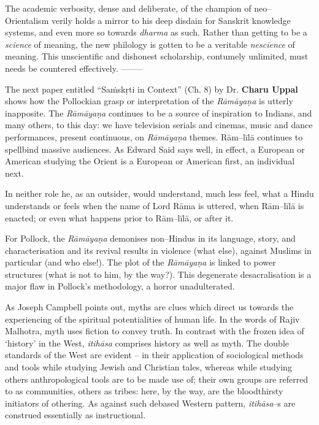 The academic verbosity, dense and deliberate, of the champion of neo–Orientalism verily holds a mirror to his deep disdain for Sanskrit knowledge systems, and even more so towards \textit{dharma} as such. Rather than getting to be a \textit{science} of meaning, the new philology is gotten to be a veritable \textit{nescience} of meaning. This unscientific and dishonest scholarship, contumely unlimited, must needs be countered effectively. –––––

The next paper entitled “Saṁskṛti in Context” (Ch. 8) by Dr. \textbf{Charu Uppal} shows how the Pollockian grasp or interpretation of the \textit{Rāmāyaṇa} is utterly inapposite. The \textit{Rāmāyaṇa} continues to be a source of inspiration to Indians, and many others, to this day: we have television serials and cinemas, music and dance performances, present continuous, on \textit{Rāmāyaṇa} themes. Rām–līlā continues to spellbind massive audiences. As Edward Said says well, in effect, a European or American studying the Orient is a European or American first, an individual next.

In neither role he, as an outsider, would understand, much less feel, what a Hindu understands or feels when the name of Lord Rāma is uttered, when Rām–līlā is enacted; or even what happens prior to Rām–līlā, or after it.

For Pollock, the \textit{Rāmāyaṇa} demonises non–Hindus in its language, story, and characterisation and its revival results in violence (what else), against Muslims in particular (and who else!). The plot of the \textit{Rāmāyaṇa} is linked to power structures (what is not to him, by the way?). This degenerate desacralisation is a major flaw in Pollock’s methodology, a horror unadulterated.

As Joseph Campbell points out, myths are clues which direct us towards the experiencing of the spiritual potentialities of human life. In the words of Rajiv Malhotra, myth uses fiction to convey truth. In contrast with the frozen idea of ‘history’ in the West, \textit{itihāsa} comprises history as well as myth. The double standards of the West are evident – in their application of sociological methods and tools while studying Jewish and Christian tales, whereas while studying others anthropological tools are to be made use of; their own groups are referred to as communities, others as tribes: here, by the way, are the bloodthirsty initiators of othering. As against such debased Western pattern, \textit{itihāsa}–s are construed essentially as instructional.

